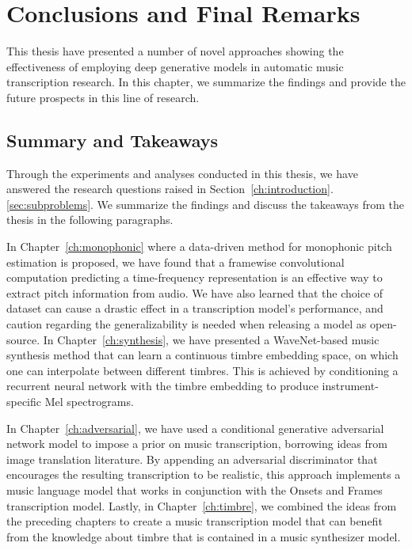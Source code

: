 
\graphicspath{{8-conclusions/figures/}}

\chapter{Conclusions and Final Remarks}
\label{ch:conclusions}

This thesis have presented a number of novel approaches showing the effectiveness of employing deep generative models in automatic music transcription research.
In this chapter, we summarize the findings and provide the future prospects in this line of research.

\section{Summary and Takeaways}


Through the experiments and analyses conducted in this thesis, we have answered the research questions raised in Section~\ref{ch:introduction}.\ref{sec:subproblems}. We summarize the findings and discuss the takeaways from the thesis in the following paragraphs.

In Chapter~\ref{ch:monophonic} where a data-driven method for monophonic pitch estimation is proposed, we have found that a framewise convolutional computation predicting a time-frequency representation is an effective way to extract pitch information from audio.
We have also learned that the choice of dataset can cause a drastic effect in a transcription model's performance, and caution regarding the generalizability is needed when releasing a model as open-source.
In Chapter~\ref{ch:synthesis}, we have presented a WaveNet-based music synthesis method that can learn a continuous timbre embedding space, on which one can interpolate between different timbres.
This is achieved by conditioning a recurrent neural network with the timbre embedding to produce instrument-specific Mel spectrograms.

In Chapter~\ref{ch:adversarial}, we have used a conditional generative adversarial network model to impose a prior on music transcription, borrowing ideas from image translation literature.
By appending an adversarial discriminator that encourages the resulting transcription to be realistic, this approach implements a music language model that works in conjunction with the Onsets and Frames transcription model.
Lastly, in Chapter~\ref{ch:timbre}, we combined the ideas from the preceding chapters to create a music transcription model that can benefit from the knowledge about timbre that is contained in a music synthesizer model.


